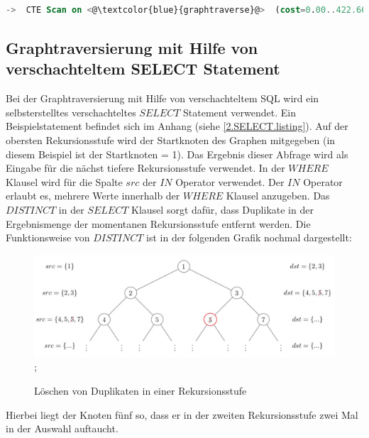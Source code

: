 \begin{lstlisting}[language=SQL,caption = Aufruf der graphtraverse Funktion im Ausführungsplan,frame=single, label={2.functionCallGraphtraverse.listing} ]
    ->  CTE Scan on <@\textcolor{blue}{graphtraverse}@>  (cost=0.00..422.66 rows=21133 width=4) (actual time=0.015..16.921 rows=6056 loops=1)
\end{lstlisting}
\subsection{Graphtraversierung mit Hilfe von verschachteltem SELECT Statement}
Bei der Graphtraversierung mit Hilfe von verschachteltem \ac{SQL} wird ein selbsterstelltes verschachteltes $SELECT$ Statement verwendet.
Ein Beispielstatement befindet sich im Anhang (siehe \ref{2.SELECT.listing}).
Auf der obersten Rekursionsstufe wird der Startknoten des Graphen mitgegeben (in diesem Beispiel ist der Startknoten = 1).
Das Ergebnis dieser Abfrage wird als Eingabe für die nächst tiefere Rekursionsstufe verwendet.
In der $WHERE$ Klausel wird für die Spalte $src$ der $IN$ Operator verwendet.
Der $IN$ Operator erlaubt es, mehrere Werte innerhalb der $WHERE$ Klausel anzugeben.
Das $DISTINCT$ in der $SELECT$ Klausel sorgt dafür, dass Duplikate in der Ergebnismenge der momentanen Rekursionsstufe entfernt werden.
Die Funktionsweise von $DISTINCT$ ist in der folgenden Grafik nochmal dargestellt:
\begin{figure}[H]
    \includegraphics[width = \linewidth]{images/Distinct.jpg};
    \caption{Löschen von Duplikaten in einer Rekursionsstufe}
\end{figure}
Hierbei liegt der Knoten fünf so, dass er in der zweiten Rekursionsstufe zwei Mal in der Auswahl auftaucht.
